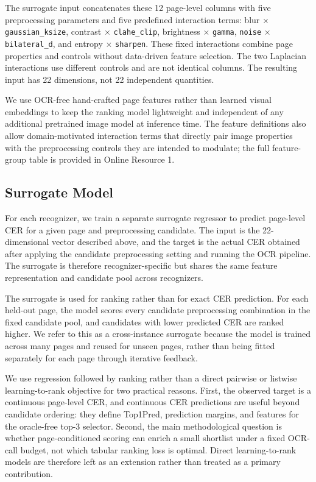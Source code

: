 \documentclass[pdflatex,sn-basic,Numbered,iicol]{sn-jnl}
\begin{document}
The surrogate input concatenates these 12 page-level columns with five preprocessing parameters and five predefined interaction terms: blur $\times$ \texttt{gaussian\_ksize}, contrast $\times$ \texttt{clahe\_clip}, brightness $\times$ \texttt{gamma}, \texttt{noise} $\times$ \texttt{bilateral\_d}, and entropy $\times$ \texttt{sharpen}. These fixed interactions combine page properties and controls without data-driven feature selection. The two Laplacian interactions use different controls and are not identical columns. The resulting input has 22 dimensions, not 22 independent quantities.

We use OCR-free hand-crafted page features rather than learned visual embeddings to keep the ranking model lightweight and independent of any additional pretrained image model at inference time. The feature definitions also allow domain-motivated interaction terms that directly pair image properties with the preprocessing controls they are intended to modulate; the full feature-group table is provided in Online Resource 1.

\subsection{Surrogate Model}

For each recognizer, we train a separate surrogate regressor to predict page-level CER for a given page and preprocessing candidate. The input is the 22-dimensional vector described above, and the target is the actual CER obtained after applying the candidate preprocessing setting and running the OCR pipeline. The surrogate is therefore recognizer-specific but shares the same feature representation and candidate pool across recognizers.

The surrogate is used for ranking rather than for exact CER prediction. For each held-out page, the model scores every candidate preprocessing combination in the fixed candidate pool, and candidates with lower predicted CER are ranked higher. We refer to this as a cross-instance surrogate because the model is trained across many pages and reused for unseen pages, rather than being fitted separately for each page through iterative feedback.

We use regression followed by ranking rather than a direct pairwise or listwise learning-to-rank objective for two practical reasons. First, the observed target is a continuous page-level CER, and continuous CER predictions are useful beyond candidate ordering: they define Top1Pred, prediction margins, and features for the oracle-free top-3 selector. Second, the main methodological question is whether page-conditioned scoring can enrich a small shortlist under a fixed OCR-call budget, not which tabular ranking loss is optimal. Direct learning-to-rank models are therefore left as an extension rather than treated as a primary contribution.
\end{document}
